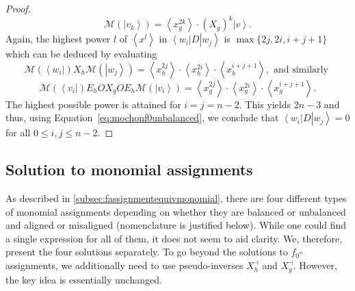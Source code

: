 \documentclass{theoretics}
\begin{document}
\begin{proof}
  \begin{displaymath}
    \mathcal{M}(\left|v_{k}\right\rangle )=\left\langle x_{g}^{2k}\right\rangle \cdot(X_{g})^{k}\left|v\right\rangle .
  \end{displaymath}
  Again, the highest power $l$ of $\left\langle x^{l}\right\rangle $
  in $\left\langle w_{i}\right|D\left|w_{j}\right\rangle $
  is $\max\{2j,2i,i+j+1\}$ which can be deduced by evaluating
  \begin{displaymath}
    \mathcal{M}(\left\langle w_{i}\right|)X_{h}\mathcal{M}(\left|w_{j}\right\rangle )=\left\langle x_{h}^{2j}\right\rangle \cdot\left\langle x_{h}^{2i}\right\rangle \cdot\left\langle x_{h}^{i+j+1}\right\rangle, \text{ and similarly }
  \end{displaymath}
  \begin{displaymath}
    \mathcal{M}(\left\langle v_{i}\right|)E_{h}OX_{g}OE_{h}\mathcal{M}(\left|v_{i}\right\rangle )=\left\langle x_{g}^{2j}\right\rangle \cdot\left\langle x_{g}^{2i}\right\rangle \cdot\left\langle x_{g}^{i+j+1}\right\rangle .
  \end{displaymath}
  The highest possible power is attained for $i=j=n-2$. This yields
  $2n-3$ and thus, using Equation~\eqref{eq:mochonf0unbalanced}, we conclude that
  $\left\langle w_{i}\right|D\left|w_{j}\right\rangle =0$ for
  all $0\le i,j\le n-2$.
\end{proof}

\subsection{Solution to monomial assignments}
\label{subsec:solutionmonomialalgebraic}
As described in \cref{subsec:fassignmentequivmonomial}, there are four different types of monomial assignments depending on whether they are balanced or unbalanced and aligned or misaligned (nomenclature is justified below).
While one could find a single expression
for all of them, it does not seem to aid clarity. We, therefore, present the four solutions separately.
%
To go beyond the solutions to $f_0$-assignments, we additionally need to use pseudo-inverses $X_{h}^{\dashv}$ and $X_{g}^{\dashv}$. However, the key idea is essentially unchanged.
%
%
%
\end{document}
